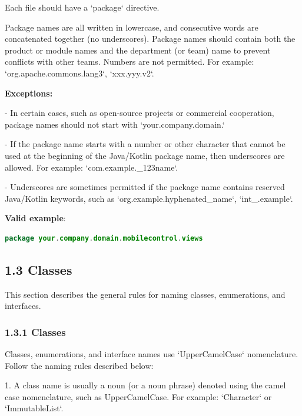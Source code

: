 Each file should have a `package` directive.

Package names are all written in lowercase, and consecutive words are concatenated together (no underscores). Package names should contain both the product or module names and the department (or team) name to prevent conflicts with other teams.  Numbers are not permitted. For example: `org.apache.commons.lang3`, `xxx.yyy.v2`.



\textbf{Exceptions:} 



- In certain cases, such as open-source projects or commercial cooperation, package names should not start with `your.company.domain.`

- If the package name starts with a number or other character that cannot be used at the beginning of the Java/Kotlin package name, then underscores are allowed. For example: `com.example._123name`.

- Underscores are sometimes permitted if the package name contains reserved Java/Kotlin keywords, such as `org.example.hyphenated_name`, `int_.example`.



\textbf{Valid example}: 

\begin{lstlisting}[language=Kotlin]
package your.company.domain.mobilecontrol.views
\end{lstlisting}


\subsection*{\textbf{1.3 Classes}}

\label{sec:1.3}

This section describes the general rules for naming classes, enumerations, and interfaces.

\subsubsection*{\textbf{1.3.1 Classes}}
\leavevmode\newline

\label{sec:1.3.1}

Classes, enumerations, and interface names use `UpperCamelCase` nomenclature. Follow the naming rules described below:

1.	A class name is usually a noun (or a noun phrase) denoted using the camel case nomenclature, such as UpperCamelCase. For example: `Character` or `ImmutableList`.


